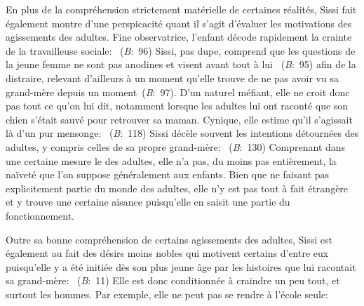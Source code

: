 \par
En plus de la compréhension strictement matérielle de certaines réalités, Sissi fait également montre d'une perspicacité quant il s'agit d'évaluer les motivations des agissements des adultes.
Fine observatrice, l'enfant décode rapidement la crainte de la travailleuse sociale: ~(\textit{B}:~96)
Sissi, pas dupe, comprend que les questions de la jeune femme ne sont pas anodines et visent avant tout à lui ~(\textit{B}:~95) afin de la distraire, relevant d'ailleurs à un moment qu'elle trouve  de ne pas avoir vu sa grand-mère depuis un moment~(\textit{B}:~97).
D'un naturel méfiant, elle ne croit donc pas tout ce qu'on lui dit, notamment lorsque les adultes lui ont raconté que son chien s'était sauvé pour retrouver sa maman.
Cynique, elle estime qu'il s'agissait là d'un pur mensonge: ~(\textit{B}:~118)
Sissi décèle souvent les intentions détournées des adultes, y compris celles de sa propre grand-mère: ~(\textit{B}:~130)
Comprenant dans une certaine mesure le  des adultes, elle n'a pas, du moins pas entièrement, la naïveté que l'on suppose généralement aux enfants.
Bien que ne faisant pas explicitement partie du monde des adultes, elle n'y est pas tout à fait étrangère et y trouve une certaine aisance puisqu'elle en saisit une partie du fonctionnement.
\par
Outre sa bonne compréhension de certains agissements des adultes, Sissi est également au fait des désirs moins nobles qui motivent certains d'entre eux puisqu'elle y a été initiée dès son plus jeune âge par les histoires que lui racontait sa grand-mère: ~(\textit{B}:~11)
Elle est donc conditionnée à craindre un peu tout, et surtout les hommes.
Par exemple, elle ne peut pas se rendre à l'école seule: 
